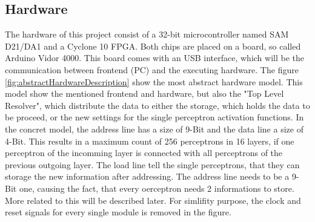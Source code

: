 \documentclass{report}
\numberwithin{equation}{section}
\begin{document}
\subsection{Hardware}
The hardware of this project consist of a 32-bit microcontroller named SAM D21/DA1 and a
Cyclone 10 FPGA. Both chips are placed on a board, so called Arduino Vidor 4000. This board
comes with an USB interface, which will be the communication between frontend (PC) and
the executing hardware. The figure \ref{fig:abstractHardwareDescription} show the most
abstract hardware model. This model show the mentioned frontend and hardware, but also the
"Top Level Resolver", which distribute the data to either the storage, which holds the data to
be proceed, or the new settings for the single perceptron activation functions. In the concret
model, the address line has a size of 9-Bit and the data line a size of 4-Bit. This results
in a maximum count of 256 perceptrons in 16 layers, if one perceptron of the incomming layer
is connected with all perceptrons of the previous outgoing layer. The load line tell the single
perceptrons, that they can storage the new information after addressing. The address line needs to be a
9-Bit one, causing the fact, that every oerceptron needs 2 informations to store. More related to this
will be described later. For simlifity purpose, the clock and reset signals for every single module
is removed in the figure.
\end{document}

